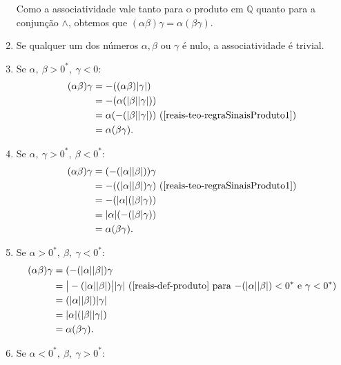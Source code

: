 \documentclass[../main.tex]{subfiles}
\begin{document}
\begin{dem}
\begin{enumerate}
            Como a associatividade vale tanto para o produto em $\mathbb{Q}$ quanto para a conjunção $\land$, obtemos que $(\alpha\beta)\gamma = \alpha(\beta\gamma)$. 
        \item Se qualquer um dos números $\alpha, \beta$ ou $\gamma$ é nulo, a associatividade é trivial.
        \item Se $\alpha,\ \beta > 0^*,\ \gamma < 0$: 
            \begin{align*}
                (\alpha\beta)\gamma &= -((\alpha\beta)\abs{\gamma}) \\
                &= -(\alpha (\abs{\beta}\abs{\gamma})) \\
                &= \alpha (-(\abs{\beta}\abs{\gamma})) \text{ (\Cref{reais-teo-regraSinaisProduto1})}\\
                &= \alpha(\beta\gamma).
            \end{align*}
        \item Se $\alpha,\ \gamma > 0^*,\ \beta < 0^*$: 
            \begin{align*}
                (\alpha\beta)\gamma &=
                (-(\abs{\alpha}\abs{\beta}))\gamma \\
                &=- ((\abs{\alpha}\abs{\beta})\gamma) \text{ (\Cref{reais-teo-regraSinaisProduto1})} \\
                &= - (\abs{\alpha}(\abs{\beta}\gamma)) \\
                &= \abs{\alpha}(-(\abs{\beta}\gamma)) \\
                &= \alpha(\beta\gamma).
            \end{align*}
        \item Se $\alpha > 0^*,\ \beta,\ \gamma < 0^*$:
            \begin{align*}
                (\alpha\beta)\gamma 
                &= (-(\abs{\alpha}\abs{\beta})\gamma \\
                &= \big|-(\abs{\alpha}\abs{\beta})\big| \abs{\gamma} \text{ (\Cref{reais-def-produto} para 
                    $-(\abs{\alpha}\abs{\beta}) < 0^*$ e $\gamma < 0^*$)} \\
                &= (\abs{\alpha}\abs{\beta})\abs{\gamma} \\
                &= \abs{\alpha} (\abs{\beta}\abs{\gamma}) \\
                &= \alpha(\beta\gamma).
            \end{align*}
        \item Se $\alpha < 0^*,\ \beta,\ \gamma > 0^*$:
            \begin{align*}

\end{align*}
\end{enumerate}
\end{dem}
\end{document}
